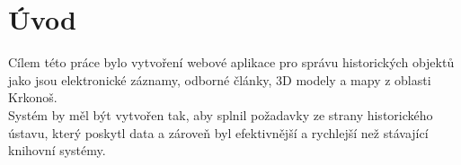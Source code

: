 \chapter{Úvod}
Cílem této práce bylo vytvoření webové aplikace pro správu historických
objektů jako jsou elektronické záznamy, odborné články, 3D modely a mapy
z oblasti Krkonoš. \\
Systém by měl být vytvořen tak, aby splnil požadavky ze
strany historického ústavu, který poskytl data a zároveň byl efektivnější
a rychlejší než stávající knihovní systémy.\\
